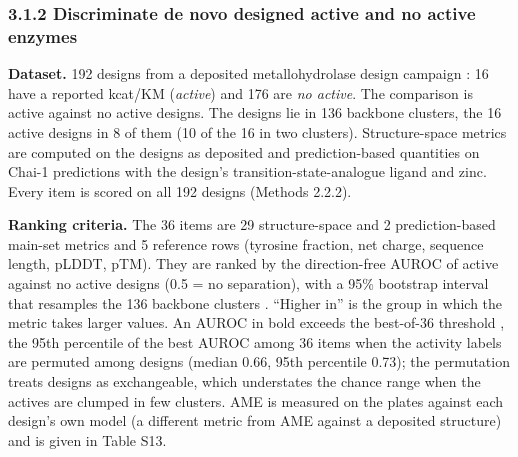 \documentclass[
  10pt,
]{article}
\DeclareRobustCommand{\_}{\textunderscore\hspace{0pt}}
\begin{document}
\subsubsection{3.1.2
Discriminate de novo
designed active and
no active enzymes}

\textbf{Dataset.}
192 designs from a
deposited
metallohydrolase
design campaign
\cite{kim2026}: 16
have a reported
kcat/KM
(\emph{active}) and
176 are \emph{no
active}. The
comparison is active
against no active
designs. The designs
lie in 136 backbone
clusters, the 16
active designs in 8
of them (10 of the
16 in two clusters).
Structure-space
metrics are computed
on the designs as
deposited and
prediction-based
quantities on Chai-1
\cite{chai2024}
predictions with the
design's
transition-state-analogue
ligand and zinc.
Every item is scored
on all 192 designs
(Methods 2.2.2).

\textbf{Ranking
criteria.} The 36
items are 29
structure-space and
2 prediction-based
main-set metrics and
5 reference rows
(tyrosine fraction,
net charge, sequence
length, pLDDT, pTM).
They are ranked by
the direction-free
AUROC
\cite{hanley1982,mann1947}
of active against no
active designs (0.5
= no separation),
with a 95\%
bootstrap interval
that resamples the
136 backbone
clusters
\cite{field2007}.
``Higher in'' is the
group in which the
metric takes larger
values. An AUROC in
bold exceeds the
best-of-36 threshold
\cite{westfall1993},
the 95th percentile
of the best AUROC
among 36 items when
the activity labels
are permuted among
designs (median
0.66, 95th
percentile 0.73);
the permutation
treats designs as
exchangeable, which
understates the
chance range when
the actives are
clumped in few
clusters. AME is
measured on the
plates against each
design's own model
(a different metric
from AME against a
deposited structure)
and is given in
Table S13.
\end{document}
